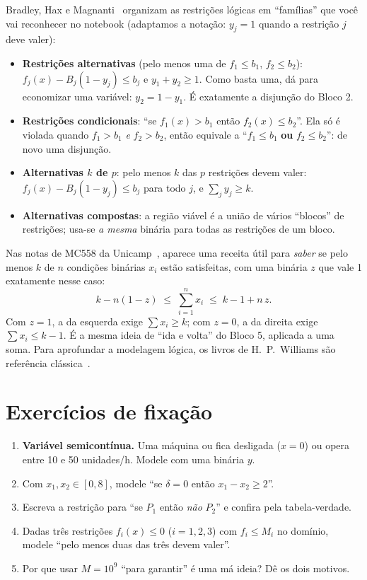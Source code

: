 \begin{outros}
Bradley, Hax e Magnanti~\cite[Seç.~9.2]{amp} organizam as restrições lógicas em ``famílias'' que você vai
reconhecer no notebook (adaptamos a notação: $y_j=1$ quando a restrição $j$ deve valer):
\begin{itemize}
  \item \textbf{Restrições alternativas} (pelo menos uma de $f_1\le b_1$, $f_2\le b_2$):
  $f_j(x)-B_j(1-y_j)\le b_j$ e $y_1+y_2\ge1$. Como basta uma, dá para economizar uma variável: $y_2=1-y_1$. É
  exatamente a disjunção do Bloco 2.
  \item \textbf{Restrições condicionais}: ``se $f_1(x)>b_1$ então $f_2(x)\le b_2$''. Ela só é violada quando
  $f_1>b_1$ \emph{e} $f_2>b_2$, então equivale a ``$f_1\le b_1$ \textbf{ou} $f_2\le b_2$'': de novo uma disjunção.
  \item \textbf{Alternativas $k$ de $p$}: pelo menos $k$ das $p$ restrições devem valer:
  $f_j(x)-B_j(1-y_j)\le b_j$ para todo $j$, e $\sum_jy_j\ge k$.
  \item \textbf{Alternativas compostas}: a região viável é a união de vários ``blocos'' de restrições; usa-se
  \emph{a mesma} binária para todas as restrições de um bloco.
\end{itemize}
\end{outros}

\begin{outros}
Nas notas de MC558 da Unicamp~\cite{ravelo}, aparece uma receita útil para \emph{saber} se pelo menos $k$ de $n$
condições binárias $x_i$ estão satisfeitas, com uma binária $z$ que vale 1 exatamente nesse caso:
\[
k-n(1-z)\;\le\;\sum_{i=1}^n x_i\;\le\;k-1+n\,z .
\]
Com $z=1$, a da esquerda exige $\sum x_i\ge k$; com $z=0$, a da direita exige $\sum x_i\le k-1$. É a mesma ideia de
``ida e volta'' do Bloco 5, aplicada a uma soma. Para aprofundar a modelagem lógica, os livros de H.~P.~Williams são
referência clássica~\cite{williams2013,williams2009}.
\end{outros}

\section*{Exercícios de fixação}
\begin{enumerate}[label=\textbf{4.\arabic*}]
  \item \textbf{Variável semicontínua.} Uma máquina ou fica desligada ($x=0$) ou opera entre 10 e 50 unidades/h.
  Modele com uma binária $y$.
  \item Com $x_1,x_2\in[0,8]$, modele ``se $\delta=0$ então $x_1-x_2\ge 2$''.
  \item Escreva a restrição para ``se $P_1$ então \emph{não} $P_2$'' e confira pela tabela-verdade.
  \item Dadas três restrições $f_i(x)\le 0$ ($i=1,2,3$) com $f_i\le M_i$ no domínio, modele ``pelo menos duas das
  três devem valer''.
  \item Por que usar $M=10^9$ ``para garantir'' é uma má ideia? Dê os dois motivos.
\end{enumerate}
